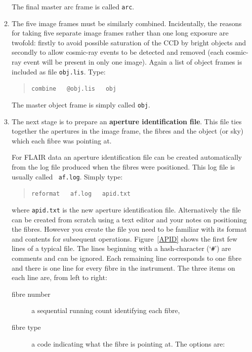 \documentclass[twoside,11pt]{article}
\begin{document}
\begin{enumerate}
   The final master arc frame is called {\tt arc}.

  \item The five image frames must be similarly combined.  Incidentally, the
   reasons for taking five separate image frames rather than one long
   exposure are twofold: firstly to avoid possible saturation of the CCD by
   bright objects and secondly to allow cosmic-ray events to be detected and
   removed (each cosmic-ray event will be present in only one image).  Again
   a list of object frames is included as file {\tt obj.lis}.  Type:

  \begin{quote}
   {\tt combine ~ @obj.lis ~ obj}
  \end{quote}

   The master object frame is simply called {\tt obj}.

  \item The next stage is to prepare an {\bf aperture
   identification file}.  This file ties together the apertures
   in the image frame, the fibres and the object (or sky)
   which each fibre was pointing at.

   For FLAIR data an aperture identification file can be
   created automatically from the log file produced when the
   fibres were positioned.  This log file is usually called {\tt
   af.log}.  Simply type:

  \begin{quote}
   {\tt reformat ~ af.log ~ apid.txt}
  \end{quote}

   where {\tt apid.txt} is the new aperture identification file.
   Alternatively the file can be created from scratch using a text editor
   and your notes on positioning the fibres.  However you create the file
   you need to be familiar with its format and contents for subsequent
   operations.  Figure~\ref{APID} shows the first few lines of a typical
   file.  The lines beginning with a hash-character (`{\tt \#}') are comments
   and can be ignored.  Each remaining line corresponds to one fibre and
   there is one line for every fibre in the instrument.  The three items on
   each line are, from left to right:

  \begin{description}

    \item[fibre number] a sequential running count identifying
     each fibre,

    \item[fibre type] a code indicating what the fibre is
     pointing at.  The options are:


\end{description}
\end{enumerate}
\end{document}
